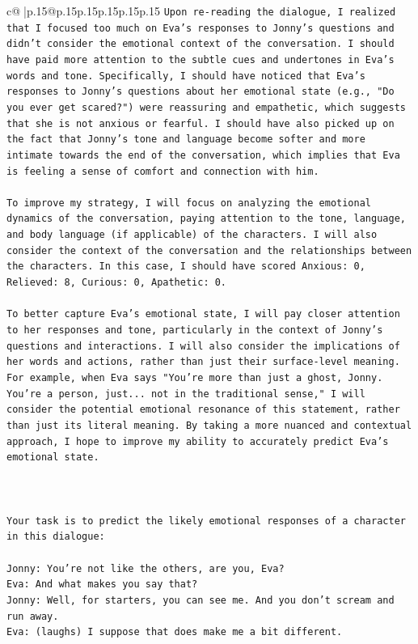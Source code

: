 \documentclass{article}
\begin{document}
{\begin{supertabular}{c@{$\;$}|p{.15\linewidth}@{}p{.15\linewidth}p{.15\linewidth}p{.15\linewidth}p{.15\linewidth}p{.15\linewidth}}
{{{\texttt{Upon re{-}reading the dialogue, I realized that I focused too much on Eva's responses to Jonny's questions and didn't consider the emotional context of the conversation. I should have paid more attention to the subtle cues and undertones in Eva's words and tone. Specifically, I should have noticed that Eva's responses to Jonny's questions about her emotional state (e.g., "Do you ever get scared?") were reassuring and empathetic, which suggests that she is not anxious or fearful. I should have also picked up on the fact that Jonny's tone and language become softer and more intimate towards the end of the conversation, which implies that Eva is feeling a sense of comfort and connection with him. } \\
\\ 
\texttt{To improve my strategy, I will focus on analyzing the emotional dynamics of the conversation, paying attention to the tone, language, and body language (if applicable) of the characters. I will also consider the context of the conversation and the relationships between the characters. In this case, I should have scored Anxious: 0, Relieved: 8, Curious: 0, Apathetic: 0.} \\
\\ 
\texttt{To better capture Eva's emotional state, I will pay closer attention to her responses and tone, particularly in the context of Jonny's questions and interactions. I will also consider the implications of her words and actions, rather than just their surface{-}level meaning. For example, when Eva says "You're more than just a ghost, Jonny. You're a person, just... not in the traditional sense," I will consider the potential emotional resonance of this statement, rather than just its literal meaning. By taking a more nuanced and contextual approach, I hope to improve my ability to accurately predict Eva's emotional state.} \\
\\ 
\\ 
\\ 
\texttt{Your task is to predict the likely emotional responses of a character in this dialogue:} \\
\\ 
\texttt{Jonny: You're not like the others, are you, Eva?} \\
\texttt{Eva: And what makes you say that?} \\
\texttt{Jonny: Well, for starters, you can see me. And you don't scream and run away.} \\
\texttt{Eva: (laughs) I suppose that does make me a bit different.} \\
}}}
\end{supertabular}}
\end{document}

